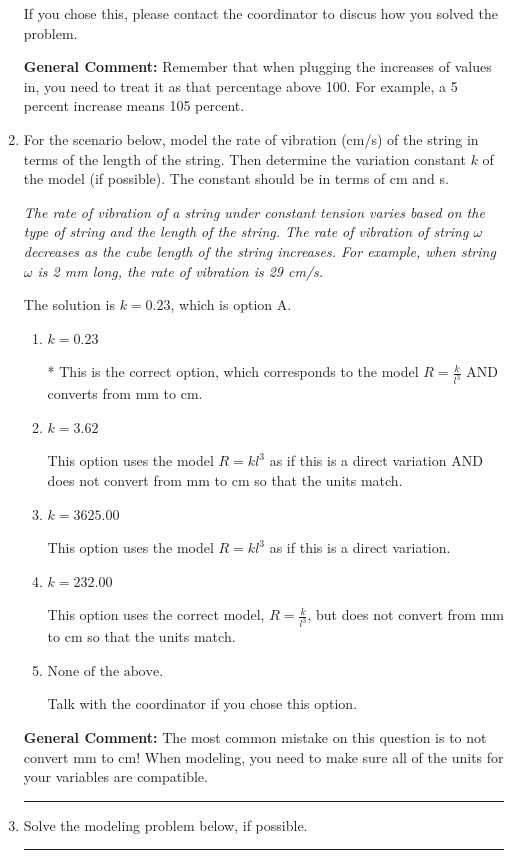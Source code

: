 \documentclass{extbook}[14pt]
\newcommand{\litem}[1]{\item #1

\rule{\textwidth}{0.4pt}}
\begin{document}
\begin{enumerate}
{\begin{enumerate}[label=\Alph*.]
If you chose this, please contact the coordinator to discus how you solved the problem.
\end{enumerate}

\textbf{General Comment:} Remember that when plugging the increases of values in, you need to treat it as that percentage above 100. For example, a 5 percent increase means 105 percent.
}
\litem{
For the scenario below, model the rate of vibration (cm/s) of the string in terms of the length of the string. Then determine the variation constant $k$ of the model (if possible). The constant should be in terms of cm and s.

\begin{center}
    \textit{ The rate of vibration of a string under constant tension varies based on the type of string and the length of the string. The rate of vibration of string $\omega$ decreases as the cube length of the string increases. For example, when string $\omega$ is 2 mm long, the rate of vibration is 29 cm/s. }
\end{center}
The solution is \( k = 0.23 \), which is option A.\begin{enumerate}[label=\Alph*.]
\item \( k = 0.23 \)

* This is the correct option, which corresponds to the model $R = \frac{k}{l^{3}}$ AND converts from mm to cm.
\item \( k = 3.62 \)

This option uses the model $R = kl^{3}$ as if this is a direct variation AND does not convert from mm to cm so that the units match.
\item \( k = 3625.00 \)

This option uses the model $R = kl^{3}$ as if this is a direct variation.
\item \( k = 232.00 \)

This option uses the correct model, $R = \frac{k}{l^{3}}$, but does not convert from mm to cm so that the units match.
\item \( \text{None of the above.} \)

Talk with the coordinator if you chose this option.
\end{enumerate}

\textbf{General Comment:} The most common mistake on this question is to not convert mm to cm! When modeling, you need to make sure all of the units for your variables are compatible.
}
\litem{
Solve the modeling problem below, if possible.

}
\end{enumerate}
\end{document}
